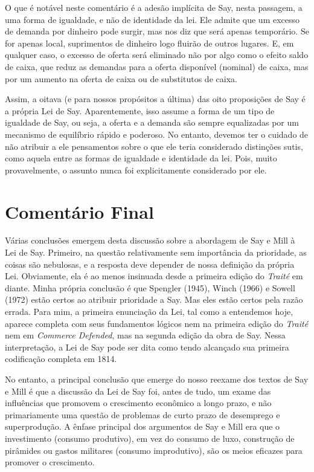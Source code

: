 \documentclass[12pt]{article}
\begin{document}
O que é notável neste comentário é a adesão implícita de Say, nesta passagem, a uma forma de igualdade, e não de identidade da lei. Ele admite que um excesso de demanda por dinheiro pode surgir, mas nos diz que será apenas temporário. Se for apenas local, suprimentos de dinheiro logo fluirão de outros lugares. E, em qualquer caso, o excesso de oferta será eliminado não por algo como o efeito saldo de caixa, que reduz as demandas para a oferta disponível (nominal) de caixa, mas por um aumento na oferta de caixa ou de substitutos de caixa.

Assim, a oitava (e para nossos propósitos a última) das oito proposições de Say é a própria Lei de Say. Aparentemente, isso assume a forma de um tipo de igualdade de Say, ou seja, a oferta e a demanda são sempre equalizadas por um mecanismo de equilíbrio rápido e poderoso. No entanto, devemos ter o cuidado de não atribuir a ele pensamentos sobre o que ele teria considerado distinções sutis, como aquela entre as formas de igualdade e identidade da lei. Pois, muito provavelmente, o assunto nunca foi explicitamente considerado por ele.

\section{Comentário Final}

Várias conclusões emergem desta discussão sobre a abordagem de Say e Mill à Lei de Say. Primeiro, na questão relativamente sem importância da prioridade, as coisas são nebulosas, e a resposta deve depender de nossa definição da própria Lei. Obviamente, ela é ao menos insinuada desde a primeira edição do \textit{Traité} em diante. Minha própria conclusão é que Spengler (1945), Winch (1966) e Sowell (1972) estão certos ao atribuir prioridade a Say. Mas eles estão certos pela razão errada. Para mim, a primeira enunciação da Lei, tal como a entendemos hoje, aparece completa com seus fundamentos lógicos nem na primeira edição do \textit{Traité} nem em \textit{Commerce Defended}, mas na segunda edição da obra de Say. Nessa interpretação, a Lei de Say pode ser dita como tendo alcançado sua primeira codificação completa em 1814.

No entanto, a principal conclusão que emerge do nosso reexame dos textos de Say e Mill é que a discussão da Lei de Say foi, antes de tudo, um exame das influências que promovem o crescimento econômico a longo prazo, e não primariamente uma questão de problemas de curto prazo de desemprego e superprodução. A ênfase principal dos argumentos de Say e Mill era que o investimento (consumo produtivo), em vez do consumo de luxo, construção de pirâmides ou gastos militares (consumo improdutivo), são os meios eficazes para promover o crescimento.
\end{document}
